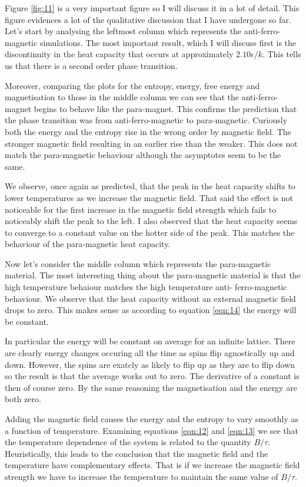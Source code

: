 \documentclass[a4paper, twocolumn]{article}
\begin{document}
Figure \ref{fig:11} is a very important figure so I will discuss it in %
a lot of detail. This figure evidences a lot of the qualitative discussion %
that I have undergone so far. Let's start by analysing the leftmost %
column which represents the anti-ferro-magnetic simulations. The most %
important result, which I will discuss first is the discontinuity in the %
heat capacity that occurs at approximately \(2.10 \epsilon / k\). This %
tells us that there is a second order phase transition. 


Moreover, comparing the plots for the entropy, energy, free energy and %
magnetisation to those in the middle column we can see that the %
anti-ferro-magnet begins to behave like the para-magnet. This confirms %
the prediction that the phase transition was from anti-ferro-magnetic %
to para-magnetic. Curiously both the energy and the entropy rise %
in the wrong order by magnetic field. The stronger magnetic field %
resulting in an earlier rise than the weaker. This does not match %
the para-magnetic behaviour although the asymptotes seem to be the same. 


We observe, once again as predicted, that the peak in the heat capacity %
shifts to lower temperatures as we increase the magnetic field. That said %
the effect is not noticeable for the first increase in the magnetic field %
strength which fails to noticeably shift the peak to the left. I also %
observed that the heat capacity seems to converge to a constant value %
on the hotter side of the peak. This matches the behaviour of the %
para-magnetic heat capacity. 


Now let's consider the middle column which represents the para-magnetic %
material. The most interesting thing about the para-magnetic material %
is that the high temperature behaiour matches the high temperature anti-%
ferro-magnetic behaviour. We observe that the heat capacity without an %
external magnetic field drops to zero. This makes sense as according to %
equation \ref{eqn:14} the energy will be constant. 


In particular the energy will be constant on average for an infinite %
lattice. There are clearly energy changes occuring all the time as %
spins flip agnostically up and down. However, the spins are exatcly %
as likely to flip up as they are to flip down so the result is that %
the average works out to zero. The derivative of a constant is then %
of course zero. By the same reasoning the magnetisation and the energy %
are both zero. 


Adding the magnetic field causes the energy and the entropy to vary %
smoothly as a function of temperature. Examining equations \ref{eqn:12} %
and \ref{eqn:13} we see that the temperature dependence of the system %
is related to the quantity \(B / \tau\). Heuristically, this leads to %
the conclusion that the magnetic field and the temperature have %
complementary effects. That is if we increase the magnetic field strength %
we have to increase the temperature to maintain the same value of %
\(B / \tau\). 
\end{document}

